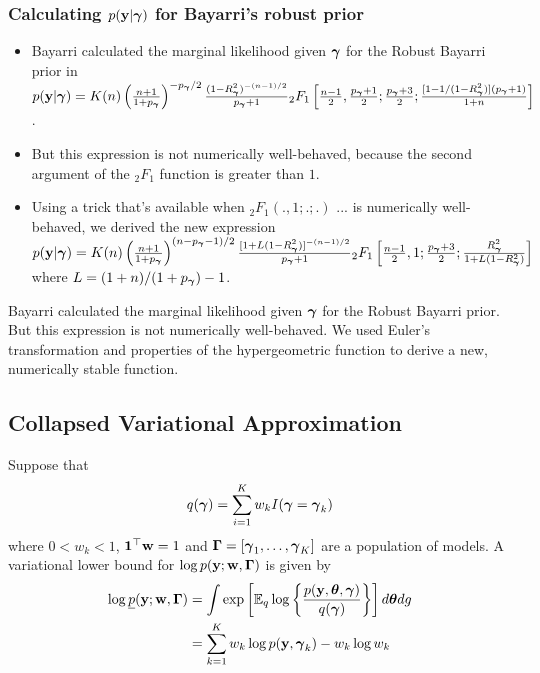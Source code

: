 \documentclass{amsart}[12pt]
\begin{document}
\subsubsection{Calculating $p({\bf y} | {\boldsymbol \gamma})$ for Bayarri's robust prior}
\begin{itemize}
	\item Bayarri calculated the marginal likelihood given ${\boldsymbol \gamma}$ for the Robust Bayarri prior
	 	in \cite{Bayarri2012} 
		\tiny
		$p({\bf y} | {\boldsymbol \gamma}) = K(n) \left(\frac{n + 1}{1 + p_{\boldsymbol \gamma}}\right)^{-p_{\boldsymbol \gamma}/2} \frac{(1 - R^2_{\boldsymbol \gamma})^{-(n-1)/2}}{p_{\boldsymbol \gamma} + 1} {}_2 F_1 \left[ \frac{n-1}{2}, \frac{p_{\boldsymbol \gamma}+1}{2}; \frac{p_{\boldsymbol \gamma} + 3}{2}; \frac{[1 - 1/(1 - R^2_{\boldsymbol \gamma})](p_{\boldsymbol \gamma} + 1)}{1 + n} \right]$.
	\small
	\item But this expression is not numerically well-behaved, because the second argument of the
				${}_2 F_1$ function is greater than $1$.
	\item Using a trick that's available when ${}_2 F_1(., 1; .; .)$ ... is numerically
				well-behaved, we derived the new expression
		\tiny
		$p({\bf y} | {\boldsymbol \gamma}) = K(n) \left(\frac{n + 1}{1 + p_{\boldsymbol \gamma}}\right)^{(n-p_{\boldsymbol \gamma}-1)/2} \frac{[1 + L (1 - R^2_{\boldsymbol \gamma})]^{-(n-1)/2}}{p_{\boldsymbol \gamma} + 1} {}_2 F_1 \left[ \frac{n-1}{2}, 1; \frac{p_{\boldsymbol \gamma} + 3}{2}; 
		\frac{R^2_{\boldsymbol \gamma}}{1 + L(1 - R^2_{\boldsymbol \gamma})} \right]$ \\
		\small
		where $L = (1 + n)/(1 + p_{\boldsymbol \gamma}) - 1$.
\end{itemize}

Bayarri calculated the marginal likelihood given ${\boldsymbol \gamma}$ for the Robust Bayarri prior.
But this expression is not numerically well-behaved.
We used Euler's transformation and properties of the hypergeometric function to derive a new,
numerically stable function.


\subsection{Collapsed Variational Approximation}

Suppose that
\[
	q({\boldsymbol \gamma}) = \sum_{i=1}^K w_k I({\boldsymbol \gamma} = {\boldsymbol \gamma}_k)
\]
where $0 < w_k < 1$, ${\bf 1}^\top {\bf w} = 1$ and ${\boldsymbol \Gamma} = [{\boldsymbol \gamma}_1, \ldots, {\boldsymbol \gamma}_K]$ are a population of
models. A variational lower bound for $\log p({\bf y}; {\bf w}, {\boldsymbol \Gamma})$ is given by
\begin{align*}
	\log \underline{p}({\bf y}; {\bf w}, {\boldsymbol \Gamma}) &= \int \exp\left[ {\mathbb E}_q \log \left\{ \frac{p({\bf y}, {\boldsymbol \theta}, {\boldsymbol \gamma})}{q({\boldsymbol \gamma})} \right\} \right] d {\boldsymbol \theta} dg \\
	&= \sum_{k=1}^K w_k \log p({\bf y}, {\boldsymbol \gamma}_k) - w_k \log w_k
\end{align*}
\end{document}
